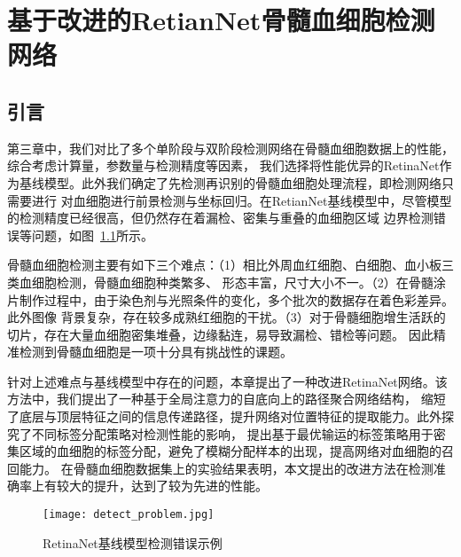 
\chapter{基于改进的RetianNet骨髓血细胞检测网络}
\section{引言}

第三章中，我们对比了多个单阶段与双阶段检测网络在骨髓血细胞数据上的性能，综合考虑计算量，参数量与检测精度等因素，
我们选择将性能优异的RetinaNet作为基线模型。此外我们确定了先检测再识别的骨髓血细胞处理流程，即检测网络只需要进行
对血细胞进行前景检测与坐标回归。在RetianNet基线模型中，尽管模型的检测精度已经很高，但仍然存在着漏检、密集与重叠的血细胞区域
边界检测错误等问题，如图~\ref{fig:detect_problem}所示。

骨髓血细胞检测主要有如下三个难点：（1）相比外周血红细胞、白细胞、血小板三类血细胞检测，骨髓血细胞种类繁多、
形态丰富，尺寸大小不一。（2）在骨髓涂片制作过程中，由于染色剂与光照条件的变化，多个批次的数据存在着色彩差异。此外图像
背景复杂，存在较多成熟红细胞的干扰。（3）对于骨髓细胞增生活跃的切片，存在大量血细胞密集堆叠，边缘黏连，易导致漏检、错检等问题。
因此精准检测到骨髓血细胞是一项十分具有挑战性的课题。

针对上述难点与基线模型中存在的问题，本章提出了一种改进RetinaNet网络。该方法中，我们提出了一种基于全局注意力的自底向上的路径聚合网络结构，
缩短了底层与顶层特征之间的信息传递路径，提升网络对位置特征的提取能力。此外探究了不同标签分配策略对检测性能的影响，
提出基于最优输运的标签策略用于密集区域的血细胞的标签分配，避免了模糊分配样本的出现，提高网络对血细胞的召回能力。
在骨髓血细胞数据集上的实验结果表明，本文提出的改进方法在检测准确率上有较大的提升，达到了较为先进的性能。

\begin{figure}[htbp]                     
  \centering                      
  \texttt{[image: detect\_problem.jpg]}                      
  \caption{RetinaNet基线模型检测错误示例}                      
  \label{fig:detect_problem}       
\end{figure}  

